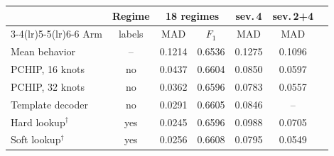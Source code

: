 \begin{tabular}{lcccccc}
\toprule
 & Regime & \multicolumn{2}{c}{18 regimes} & sev.\,4 & sev.\,2+4 \\
\cmidrule(lr){3-4}\cmidrule(lr){5-5}\cmidrule(lr){6-6}
Arm & labels & MAD & $F_1$ & MAD & MAD \\
\midrule
Mean behavior & -- & 0.1214 & 0.6536 & 0.1275 & 0.1096 \\
PCHIP, 16 knots & no & 0.0437 & 0.6604 & 0.0850 & 0.0597 \\
PCHIP, 32 knots & no & 0.0362 & 0.6596 & 0.0783 & 0.0557 \\
Template decoder & no & 0.0291 & 0.6605 & 0.0846 & -- \\
Hard lookup$^\dagger$ & yes & 0.0245 & 0.6596 & 0.0988 & 0.0705 \\
Soft lookup$^\dagger$ & yes & 0.0256 & 0.6608 & 0.0795 & 0.0549 \\
\bottomrule
\end{tabular}
